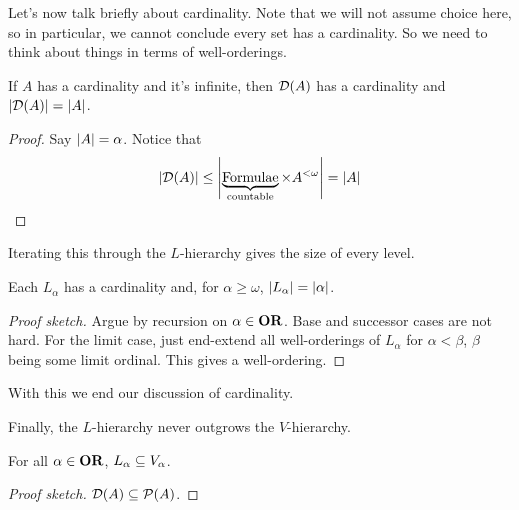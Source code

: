 Let's now talk briefly about cardinality. Note that we will not assume choice here, so in particular, we cannot conclude every set has a cardinality. So we need to think about things in terms of well-orderings.

\begin{boxlemma}
    If $A$ has a cardinality and it's infinite, then $\mathcal{D}(A)$ has a cardinality and $\left\lvert \mathcal{D}(A) \right\rvert = \left\lvert A \right\rvert$.
\end{boxlemma}
\begin{proof}
    Say $\left\lvert A \right\rvert = \alpha$. Notice that
    \begin{align*}
        \left\lvert \mathcal{D}(A) \right\rvert \leq \left\lvert \underbrace{\text{Formulae}}_{\text{countable}} \times A^{<\omega} \right\rvert = \left\lvert A \right\rvert
    \end{align*}
\end{proof}

Iterating this through the $L$-hierarchy gives the size of every level.

\begin{boxcorollary} \label{Ch4:Cor:L_Alpha_Cardinality}
    Each $L_{\alpha}$ has a cardinality and, for $\alpha \geq \omega$, $\left\lvert L_{\alpha} \right\rvert = \left\lvert \alpha \right\rvert$.
\end{boxcorollary}
\begin{proof}[Proof sketch]
    Argue by recursion on $\alpha \in \mathbf{OR}$. Base and successor cases are not hard. For the limit case, just end-extend all well-orderings of $L_{\alpha}$ for $\alpha < \beta$, $\beta$ being some limit ordinal. This gives a well-ordering.
\end{proof}

With this we end our discussion of cardinality.

Finally, the $L$-hierarchy never outgrows the $V$-hierarchy.

\begin{boxlemma}
    For all $\alpha \in \mathbf{OR}$, $L_{\alpha} \subseteq V_{\alpha}$.
\end{boxlemma}
\begin{proof}[Proof sketch]
    $\mathcal{D}(A) \subseteq \mathcal{P}(A)$.
\end{proof}
